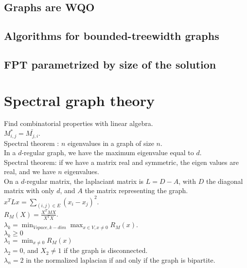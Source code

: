 \documentclass[12pt,a4paper]{article}
\begin{document}
\subsection{Graphs are WQO}
\subsection{Algorithms for bounded-treewidth graphs}
\subsection{FPT parametrized by size of the solution}


\section{Spectral graph theory}

Find combinatorial properties with linear algebra.\\

$M^*_{i,j} = \bar{M_{j,i}}$.\\

Spectral theorem : $n$ eigenvalues in a graph of size $n$.\\

In a $d$-regular graph, we have the maximum eigenvalue equal to $d$.\\

Spectral theorem: if we have a matrix real and symmetric, the eigen values are
real, and we have $n$ eigenvalues.\\

On a $d$-regular matrix, the laplaciant matrix is $L = D - A$, with $D$ the
diagonal matrix with only $d$, and $A$ the matrix representing the graph.\\

$x^TLx = \sum_{(i,j) \in E} (x_i - x_j)^2$.\\
$R_M(X) = \frac{X^TMX}{X^TX}$.\\
$\lambda_k = \min_{V space, k-dim}\max_{x \in V, x \neq 0}R_M(x)$.\\

$\lambda_k \geq 0$\\
$\lambda_1 = \min_{x \neq 0} R_M(x)$\\
$\lambda_2 = 0$, and $X_2 \neq 1$ if the graph is disconnected.\\

$\lambda_n = 2$ in the normalized laplacian if and only if the graph is
bipartite.\\
\end{document}
